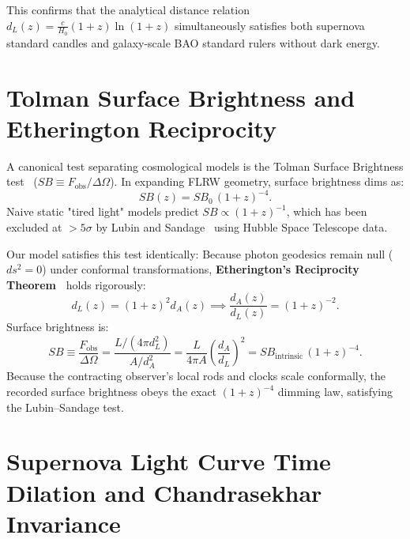 \documentclass[11pt,a4paper]{article}
\begin{document}
This confirms that the analytical distance relation $d_L(z) = \frac{c}{H_0}(1+z)\ln(1+z)$ simultaneously satisfies both supernova standard candles and galaxy-scale BAO standard rulers without dark energy.

\section{Tolman Surface Brightness and Etherington Reciprocity}
\label{sec:tolman_etherington}

A canonical test separating cosmological models is the Tolman Surface Brightness test~\cite{tolman1930} ($SB \equiv F_{\mathrm{obs}} / \Delta \Omega$). In expanding FLRW geometry, surface brightness dims as:
\begin{equation}
    SB(z) = SB_0 \, (1+z)^{-4}.
    \label{eq:tolman_standard}
\end{equation}
Naive static "tired light" models predict $SB \propto (1+z)^{-1}$, which has been excluded at $>5\sigma$ by Lubin and Sandage~\cite{lubin2001} using Hubble Space Telescope data.

Our model satisfies this test identically:
Because photon geodesics remain null ($ds^2 = 0$) under conformal transformations, \textbf{Etherington's Reciprocity Theorem~\cite{etherington1933}} holds rigorously:
\begin{equation}
    d_L(z) = (1+z)^2 d_A(z) \implies \frac{d_A(z)}{d_L(z)} = (1+z)^{-2}.
    \label{eq:etherington_proof}
\end{equation}
Surface brightness is:
\begin{equation}
    SB \equiv \frac{F_{\mathrm{obs}}}{\Delta \Omega} = \frac{L / (4\pi d_L^2)}{A / d_A^2} = \frac{L}{4\pi A} \left( \frac{d_A}{d_L} \right)^2 = SB_{\mathrm{intrinsic}} \, (1+z)^{-4}.
    \label{eq:tolman_proof}
\end{equation}
Because the contracting observer's local rods and clocks scale conformally, the recorded surface brightness obeys the exact $(1+z)^{-4}$ dimming law, satisfying the Lubin--Sandage test.

\section{Supernova Light Curve Time Dilation and Chandrasekhar Invariance}
\label{sec:time_dilation_chandrasekhar}
\end{document}
